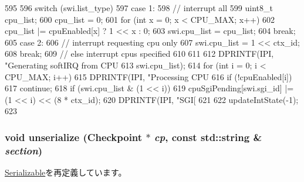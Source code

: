 \begin{DoxyCode}
595 {
596     switch (swi.list_type) {
597       case 1:
598         // interrupt all
599         uint8_t cpu_list;
600         cpu_list = 0;
601         for (int x = 0; x < CPU_MAX; x++)
602             cpu_list |= cpuEnabled[x] ? 1 << x : 0;
603         swi.cpu_list = cpu_list;
604         break;
605       case 2:
606         // interrupt requesting cpu only
607         swi.cpu_list = 1 << ctx_id;
608         break;
609         // else interrupt cpus specified
610     }
611 
612     DPRINTF(IPI, "Generating softIRQ from CPU %
613             swi.cpu_list);
614     for (int i = 0; i < CPU_MAX; i++) {
615         DPRINTF(IPI, "Processing CPU %
616         if (!cpuEnabled[i])
617             continue;
618         if (swi.cpu_list & (1 << i))
619             cpuSgiPending[swi.sgi_id] |= (1 << i) << (8 * ctx_id);
620         DPRINTF(IPI, "SGI[%
621     }
622     updateIntState(-1);
623 }
\end{DoxyCode}
\hypertarget{classPl390_af22e5d6d660b97db37003ac61ac4ee49}{
\subsubsection[{unserialize}]{\setlength{\rightskip}{0pt plus 5cm}void unserialize ({\bf Checkpoint} $\ast$ {\em cp}, \/  const std::string \& {\em section})}}
\label{classPl390_af22e5d6d660b97db37003ac61ac4ee49}


\hyperlink{classSerializable_af100c4e9feabf3cd918619c88c718387}{Serializable}を再定義しています。


